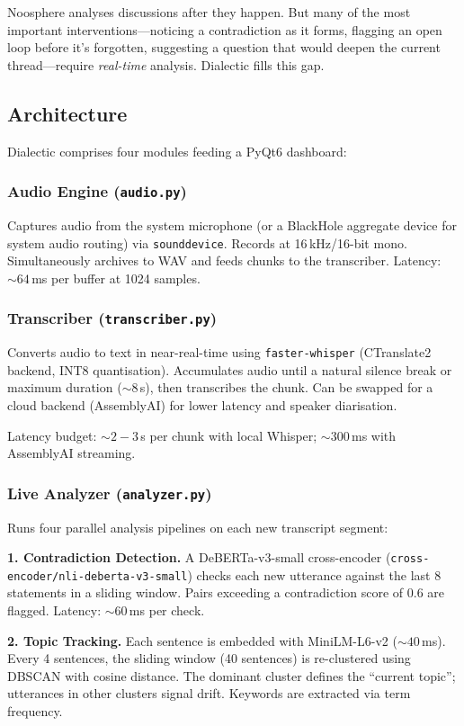 \documentclass[11pt,letterpaper]{article}
\begin{document}
Noosphere analyses discussions after they happen. But many of the most important interventions---noticing a contradiction as it forms, flagging an open loop before it's forgotten, suggesting a question that would deepen the current thread---require \emph{real-time} analysis. Dialectic fills this gap.

\subsection{Architecture}

Dialectic comprises four modules feeding a PyQt6 dashboard:

\subsubsection{Audio Engine (\texttt{audio.py})}
Captures audio from the system microphone (or a BlackHole aggregate device for system audio routing) via \texttt{sounddevice}. Records at 16\,kHz/16-bit mono. Simultaneously archives to WAV and feeds chunks to the transcriber. Latency: ${\sim}64$\,ms per buffer at 1024 samples.

\subsubsection{Transcriber (\texttt{transcriber.py})}
Converts audio to text in near-real-time using \texttt{faster-whisper} (CTranslate2 backend, INT8 quantisation). Accumulates audio until a natural silence break or maximum duration (${\sim}8$\,s), then transcribes the chunk. Can be swapped for a cloud backend (AssemblyAI) for lower latency and speaker diarisation.

Latency budget: ${\sim}2{-}3$\,s per chunk with local Whisper; ${\sim}300$\,ms with AssemblyAI streaming.

\subsubsection{Live Analyzer (\texttt{analyzer.py})}
Runs four parallel analysis pipelines on each new transcript segment:

\textbf{1. Contradiction Detection.} A DeBERTa-v3-small cross-encoder (\texttt{cross-encoder/nli-deberta-v3-small}) checks each new utterance against the last 8 statements in a sliding window. Pairs exceeding a contradiction score of 0.6 are flagged. Latency: ${\sim}60$\,ms per check.

\textbf{2. Topic Tracking.} Each sentence is embedded with MiniLM-L6-v2 (${\sim}40$\,ms). Every 4 sentences, the sliding window (40 sentences) is re-clustered using DBSCAN with cosine distance. The dominant cluster defines the ``current topic''; utterances in other clusters signal drift. Keywords are extracted via term frequency.
\end{document}
